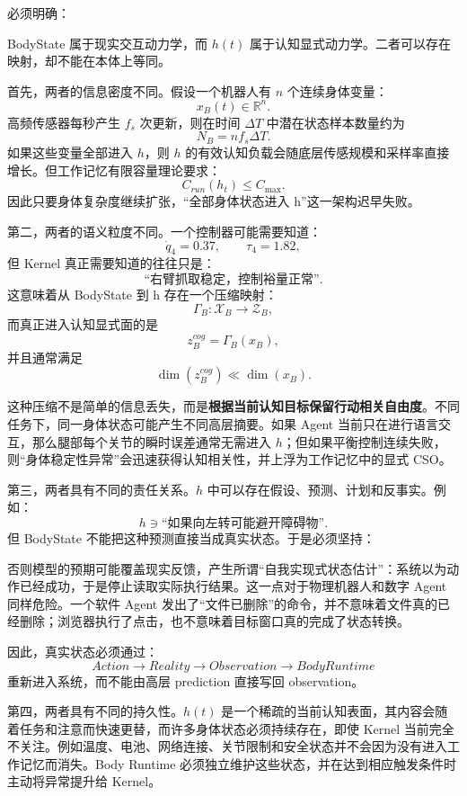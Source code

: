 必须明确：
\begin{statementbox}
\centering
{}
\end{statementbox}

BodyState 属于现实交互动力学，而 $h(t)$ 属于认知显式动力学。二者可以存在映射，却不能在本体上等同。

首先，两者的信息密度不同。假设一个机器人有 $n$ 个连续身体变量：
\[
x_B(t)\in\mathbb R^n.
\]
高频传感器每秒产生 $f_s$ 次更新，则在时间 $\Delta T$ 中潜在状态样本数量约为
\[
N_B
=
n f_s\Delta T.
\]
如果这些变量全部进入 $h$，则 $h$ 的有效认知负载会随底层传感规模和采样率直接增长。但工作记忆有限容量理论要求：
\[
C_{run}(h_t)
\leq
C_{\max}.
\]
因此只要身体复杂度继续扩张，“全部身体状态进入 h”这一架构迟早失败。

第二，两者的语义粒度不同。一个控制器可能需要知道：
\[
\dot q_4=0.37,\qquad
\tau_4=1.82,
\]
但 Kernel 真正需要知道的往往只是：
\[
\text{``右臂抓取稳定，控制裕量正常''}.
\]
这意味着从 BodyState 到 h 存在一个压缩映射：
\[
\Gamma_B:
\mathcal X_B
\rightarrow
\mathcal Z_B,
\]
而真正进入认知显式面的是
\[
z_B^{cog}
=
\Gamma_B(x_B),
\]
并且通常满足
\[
\dim(z_B^{cog})
\ll
\dim(x_B).
\]

这种压缩不是简单的信息丢失，而是\textbf{根据当前认知目标保留行动相关自由度}。不同任务下，同一身体状态可能产生不同高层摘要。如果 Agent 当前只在进行语言交互，那么腿部每个关节的瞬时误差通常无需进入 $h$；但如果平衡控制连续失败，则“身体稳定性异常”会迅速获得认知相关性，并上浮为工作记忆中的显式 CSO。

第三，两者具有不同的责任关系。$h$ 中可以存在假设、预测、计划和反事实。例如：
\[
h
\ni
\text{``如果向左转可能避开障碍物''}.
\]
但 BodyState 不能把这种预测直接当成真实状态。于是必须坚持：
\begin{statementbox}
\centering
{}
\end{statementbox}
否则模型的预期可能覆盖现实反馈，产生所谓“自我实现式状态估计”：系统以为动作已经成功，于是停止读取实际执行结果。这一点对于物理机器人和数字 Agent 同样危险。一个软件 Agent 发出了“文件已删除”的命令，并不意味着文件真的已经删除；浏览器执行了点击，也不意味着目标窗口真的完成了状态转换。

因此，真实状态必须通过：
\[
Action
\rightarrow
Reality
\rightarrow
Observation
\rightarrow
BodyRuntime
\]
重新进入系统，而不能由高层 prediction 直接写回 observation。

第四，两者具有不同的持久性。$h(t)$ 是一个稀疏的当前认知表面，其内容会随着任务和注意而快速更替，而许多身体状态必须持续存在，即使 Kernel 当前完全不关注。例如温度、电池、网络连接、关节限制和安全状态并不会因为没有进入工作记忆而消失。Body Runtime 必须独立维护这些状态，并在达到相应触发条件时主动将异常提升给 Kernel。

